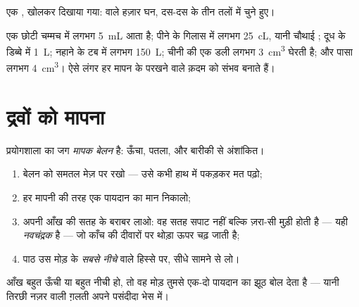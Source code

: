 \begin{omfigure}

{\small एक , खोलकर दिखाया गया:  वाले हज़ार घन, दस-दस के
तीन तलों में चुने हुए।}
\end{omfigure}

\begin{example}\label{ex:g6:mass-and-volume:byheart}
एक छोटी चम्मच में लगभग \qty{5}{mL} आता है; पीने के गिलास में लगभग
\qty{25}{cL}, यानी चौथाई ; दूध के डिब्बे में \qty{1}{L}; नहाने के
टब में लगभग \qty{150}{L}; चीनी की एक डली लगभग \qty{3}{cm^3} घेरती
है; और पासा लगभग \qty{4}{cm^3}। ऐसे लंगर हर मापन के परखने वाले क़दम
को संभव बनाते हैं।
\end{example}

\section{द्रवों को मापना}

\begin{method}[मापक बेलन पढ़ना]\label{met:g6:mass-and-volume:cylinder}
प्रयोगशाला का जग \emph{मापक बेलन} है: ऊँचा, पतला, और बारीकी से
अंशांकित।
\begin{enumerate}
  \item बेलन को समतल मेज़ पर रखो --- उसे कभी हाथ में पकड़कर मत
        पढ़ो;
  \item हर मापनी की तरह एक पायदान का मान निकालो;
  \item अपनी आँख  की सतह के बराबर लाओ: वह सतह सपाट नहीं बल्कि
        ज़रा-सी मुड़ी होती है --- यही
        \emph{नवचंद्रक} है --- जो काँच की दीवारों
        पर थोड़ा ऊपर चढ़ जाती है;
  \item पाठ उस मोड़ के \emph{सबसे नीचे} वाले हिस्से पर, सीधे सामने
        से लो।
\end{enumerate}
आँख बहुत ऊँची या बहुत नीची हो, तो वह मोड़ तुमसे एक-दो पायदान का झूठ
बोल देता है --- यानी तिरछी नज़र वाली ग़लती अपने पसंदीदा भेस में।
\end{method}

